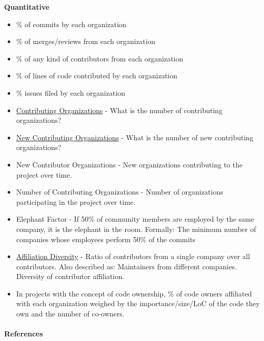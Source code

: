 \textbf{Quantitative}

\begin{itemize}
\tightlist
\item
  \% of commits by each organization
\item
  \% of merges/reviews from each organization
\item
  \% of any kind of contributors from each organization
\item
  \% of lines of code contributed by each organization
\item
  \% issues filed by each organization
\item
  \href{https://github.com/chaoss/metrics/blob/master/activity-metrics/contributing-organizations.md}{Contributing
  Organizations} - What is the number of contributing organizations?
\item
  \href{https://github.com/chaoss/metrics/blob/master/activity-metrics/new-contributing-organizations.md}{New
  Contributing Organizations} - What is the number of new contributing
  organizations?
\item
  New Contributor Organizations - New organizations contributing to the
  project over time.
\item
  Number of Contributing Organizations - Number of organizations
  participating in the project over time.
\item
  Elephant Factor - If 50\% of community members are employed by the
  same company, it is the elephant in the room. Formally: The minimum
  number of companies whose employees perform 50\% of the commits
\item
  \href{https://github.com/chaoss/metrics/blob/master/activity-metrics/contributor-diversity.md}{Affiliation
  Diversity} - Ratio of contributors from a single company over all
  contributors. Also described as: Maintainers from different companies.
  Diversity of contributor affiliation.
\item
  In projects with the concept of code ownership, \% of code owners
  affiliated with each organization weighed by the importance/size/LoC
  of the code they own and the number of co-owners.
\end{itemize}

\hypertarget{references}{%
\paragraph{References}\label{references}}

